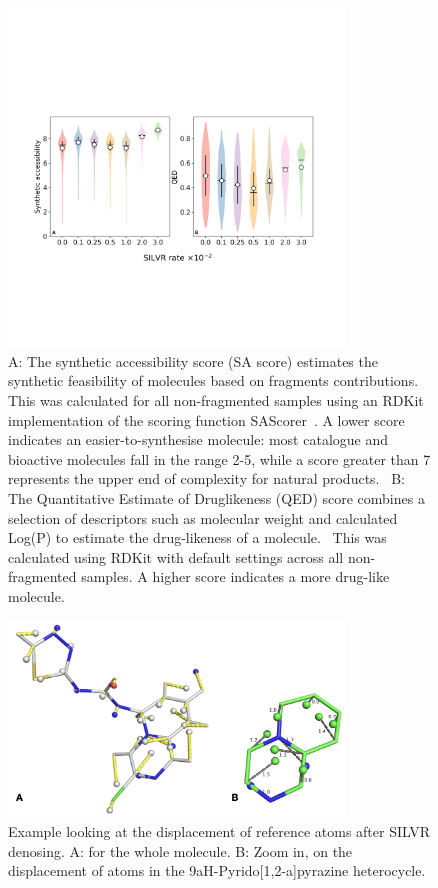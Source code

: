 \documentclass[journal=jacsat,manuscript=article]{achemso}
\begin{document}
\begin{suppinfo}
\begin{figure}
    \centering
    \includegraphics[width=0.8\textwidth]{paper/Figures/FigS4/si_fig_2d_measures_violins.png}
    \caption{A: The synthetic accessibility score (SA score) estimates the synthetic feasibility of molecules based on fragments contributions.~\cite{ertl2009estimation} This was calculated for all non-fragmented samples using an RDKit implementation of the scoring function SAScorer~\cite{ertl2009estimation}. A lower score indicates an easier-to-synthesise molecule: most catalogue and bioactive molecules fall in the range 2-5, while a score greater than 7 represents the upper end of complexity for natural products.~\cite{ertl2009estimation} B: The Quantitative Estimate of Druglikeness (QED) score combines a selection of descriptors such as molecular weight and calculated Log(P) to estimate the drug-likeness of a molecule.~\cite{bickerton2012quantifying, wildman1999prediction} This was calculated using RDKit with default settings across all non-fragmented samples. A higher score indicates a more drug-like molecule.}
    \label{fig:SA_QED}
\end{figure}

\begin{figure}
    \centering
    \includegraphics[width=0.8\textwidth]{paper/Figures/FigS5/FigS3.png}
    \caption{Example looking at the displacement of reference atoms after SILVR denosing. A: for the whole molecule. B: Zoom in, on the displacement of atoms in the 9aH-Pyrido[1,2-a]pyrazine heterocycle. }
    \label{fig:atom_displacement}
\end{figure}


\end{suppinfo}
\end{document}
